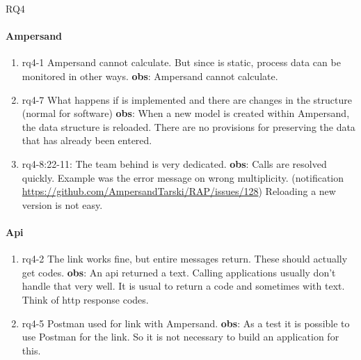 \def\rq{RQ4}

\acrlong{\rq}
\paragraph{Ampersand}
\begin{enumerate}
    \item rq4-1 Ampersand cannot calculate.
    But since  is static, process data can be monitored in other ways.
    \newline\textbf{obs}: Ampersand cannot calculate.

    \item rq4-7 What happens if  is implemented and there are changes in the structure (normal for software)
    \newline\textbf{obs}: When a new model is created within Ampersand, the data structure is reloaded.
    There are no provisions for preserving the data that has already been entered.

    \item rq4-8:22-11: The team behind  is very dedicated.
    \newline\textbf{obs}: Calls are resolved quickly.
    Example was the error message on wrong multiplicity.
    (notification \url{https://github.com/AmpersandTarski/RAP/issues/128})
    Reloading a new version is not easy.

\end{enumerate}

\paragraph{Api}
\begin{enumerate}
    \item rq4-2 The  link works fine, but entire messages return.
    These should actually get codes.
    \newline\textbf{obs}: An api returned a text.
    Calling applications usually don't handle that very well.
    It is usual to return a code and sometimes with text.
    Think of http response codes.

    \item rq4-5 Postman used for  link with Ampersand.
    \newline\textbf{obs}: As a test it is possible to use Postman for the link.
    So it is not necessary to build an application for this.

\end{enumerate}

